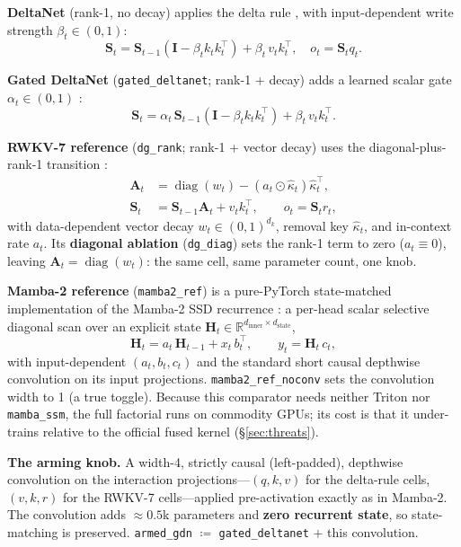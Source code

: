 \documentclass{article}
\newcommand{\R}{\mathbb{R}}
\newcommand{\dstate}{d_{\mathrm{state}}}
\newcommand{\dkey}{d_k}
\newcommand{\St}{\mathbf{S}_t}
\newcommand{\Stp}{\mathbf{S}_{t-1}}
\newcommand{\armed}{\texttt{armed\_gdn}}
\newcommand{\gdn}{\texttt{gated\_deltanet}}
\newcommand{\dgrank}{\texttt{dg\_rank}}
\newcommand{\dgdiag}{\texttt{dg\_diag}}
\newcommand{\mambaref}{\texttt{mamba2\_ref}}
\newcommand{\mambanoconv}{\texttt{mamba2\_ref\_noconv}}
\begin{document}
\textbf{DeltaNet} (rank-1, no decay) applies the delta rule \citep{schlag2021fastweight,yang2024deltanet}, with input-dependent write strength $\beta_t \in (0,1)$:
\begin{equation}
\St = \Stp\!\left(\mathbf{I} - \beta_t k_t k_t^{\top}\right) + \beta_t\, v_t k_t^{\top},
\quad o_t = \St q_t .
\end{equation}

\textbf{Gated DeltaNet} (\gdn; rank-1 + decay) adds a learned scalar gate $\alpha_t\in(0,1)$ \citep{yang2024gateddeltanet}:
\begin{equation}
\St = \alpha_t\, \Stp\!\left(\mathbf{I} - \beta_t k_t k_t^{\top}\right) + \beta_t\, v_t k_t^{\top}.
\end{equation}

\textbf{RWKV-7 reference} (\dgrank; rank-1 + vector decay) uses the diagonal-plus-rank-1 transition \citep{peng2025rwkv7}:
\begin{align}
\mathbf{A}_t &= \operatorname{diag}(w_t) - (a_t \odot \hat{\kappa}_t)\hat{\kappa}_t^{\top},\\
\St &= \Stp \mathbf{A}_t + v_t k_t^{\top},
\qquad o_t = \St r_t,
\end{align}
with data-dependent vector decay $w_t\in(0,1)^{\dkey}$, removal key $\hat\kappa_t$, and in-context rate $a_t$. Its \textbf{diagonal ablation} (\dgdiag) sets the rank-1 term to zero ($a_t\equiv 0$), leaving $\mathbf{A}_t=\operatorname{diag}(w_t)$: the same cell, same parameter count, one knob.

\textbf{Mamba-2 reference} (\mambaref) is a pure-PyTorch state-matched implementation of the Mamba-2 SSD recurrence \citep{dao2024mamba2}: a per-head scalar selective diagonal scan over an explicit state $\mathbf{H}_t\in\R^{d_{\mathrm{inner}}\times \dstate}$,
\begin{equation}
\mathbf{H}_t = a_t\,\mathbf{H}_{t-1} + x_t\, b_t^{\top}, \qquad y_t = \mathbf{H}_t\, c_t,
\end{equation}
with input-dependent $(a_t,b_t,c_t)$ and the standard short causal depthwise convolution on its input projections. \mambanoconv{} sets the convolution width to 1 (a true toggle). Because this comparator needs neither Triton nor \texttt{mamba\_ssm}, the full factorial runs on commodity GPUs; its cost is that it under-trains relative to the official fused kernel (\S\ref{sec:threats}).

\textbf{The arming knob.} A width-4, strictly causal (left-padded), depthwise convolution on the interaction projections---$(q,k,v)$ for the delta-rule cells, $(v,k,r)$ for the RWKV-7 cells---applied pre-activation exactly as in Mamba-2. The convolution adds ${\approx}0.5$k parameters and \textbf{zero recurrent state}, so state-matching is preserved. \armed{} $\coloneqq$ \gdn{} $+$ this convolution.
\end{document}
